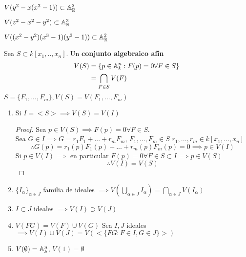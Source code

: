\begin{ejm}
    $V(y^2-x(x^2-1))\subset\mathbb{A}_{\mathbb{R}}^2$ %
\end{ejm}

\begin{ejm}
    $V(z^2-x^2-y^2)\subset\mathbb{A}_{\mathbb{R}}^3$ %
\end{ejm}

\begin{ejm}
    $V((x^2-y^2)(x^3-1)(y^3-1))\subset\mathbb{A}_{\mathbb{R}}^2$ %
\end{ejm}

\begin{defn}
    Sea $S\subset k[x_1,..,x_n]$. Un \textbf{conjunto algebraico afín}
    \begin{align*}
        V(S) & =\{p\in\mathbb{A}^n_k:F(p)=0\forall F\in S\} \\
             & =\bigcap_{F\in S}V(F)
    \end{align*}
    $S=\{F_1,...,F_m\}, V(S)=V(F_1,...,F_m)$
\end{defn}
\begin{ppty}
    \begin{enumerate}
        \item Si $I=<S>\implies V(S)=V(I)$
              \begin{proof}
                  Sea $p\in V(S)\implies F(p)=0\forall F\in S$.\\
                  Sea $G\in I\implies G=r_1F_1+...+r_mF_m$, $F_1,...,F_m\in S$ $r_1,...,r_m\in k[x_1,...,x_n]$\\
                  \[\therefore G(p)=r_1(p)F_1(p)+...+r_m(p)F_m(p)=0\implies p\in V(I)\]
                  Si $p\in V(I)\implies$ en particular $F(p)=0\forall F\in S\subset I\implies p\in V(S)$\\
                  \[\therefore V(I)=V(S)\]
              \end{proof}
        \item $\{I_\alpha\}_{\alpha\in J}$ familia de ideales $\implies V(\bigcup_{\alpha\in J}I_\alpha)=\bigcap_{\alpha\in J}V(I_\alpha)$
        \item $I\subset J$ ideales $\implies V(I)\supset V(J)$
        \item $V(FG)=V(F)\cup V(G)$ Sea $I,J$ ideales $\implies V(I)\cup V(J)=V(<\{FG:F\in I, G\in J\}>)$
        \item $V(\emptyset)=\mathbb{A}_k^n$, $V(1)=\emptyset$
    \end{enumerate}
\end{ppty}

